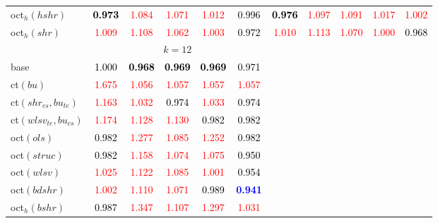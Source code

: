 \begin{tabular}[t]{l|>{}cccc>{}c|ccccc}
oct$_h(hshr)$ & \textcolor{black}{\textbf{0.973}} & \textcolor{red}{1.084} & \textcolor{red}{1.071} & \textcolor{red}{1.012} & \textcolor{black}{0.996} & \textcolor{black}{\textbf{0.976}} & \textcolor{red}{1.097} & \textcolor{red}{1.091} & \textcolor{red}{1.017} & \textcolor{red}{1.002}\\
oct$_h(shr)$ & \textcolor{red}{1.009} & \textcolor{red}{1.108} & \textcolor{red}{1.062} & \textcolor{red}{1.003} & \textcolor{black}{0.972} & \textcolor{red}{1.010} & \textcolor{red}{1.113} & \textcolor{red}{1.070} & \textcolor{red}{1.000} & \textcolor{black}{0.968}\\
\addlinespace[0.3em]
\multicolumn{1}{c}{} & \multicolumn{5}{c}{\textbf{$k = 12$}} & \multicolumn{5}{c}{}\\
base & \textcolor{black}{1.000} & \textcolor{black}{\textbf{0.968}} & \textcolor{black}{\textbf{0.969}} & \textcolor{black}{\textbf{0.969}} & \textcolor{black}{0.971} &  &  &  &  & \\
ct$(bu)$ & \textcolor{red}{1.675} & \textcolor{red}{1.056} & \textcolor{red}{1.057} & \textcolor{red}{1.057} & \textcolor{red}{1.057} &  &  &  &  & \\
ct$(shr_{cs}, bu_{te})$ & \textcolor{red}{1.163} & \textcolor{red}{1.032} & \textcolor{black}{0.974} & \textcolor{red}{1.033} & \textcolor{black}{0.974} &  &  &  &  & \\
ct$(wlsv_{te}, bu_{cs})$ & \textcolor{red}{1.174} & \textcolor{red}{1.128} & \textcolor{red}{1.130} & \textcolor{black}{0.982} & \textcolor{black}{0.982} &  &  &  &  & \\
oct$(ols)$ & \textcolor{black}{0.982} & \textcolor{red}{1.277} & \textcolor{red}{1.085} & \textcolor{red}{1.252} & \textcolor{black}{0.982} &  &  &  &  & \\
oct$(struc)$ & \textcolor{black}{0.982} & \textcolor{red}{1.158} & \textcolor{red}{1.074} & \textcolor{red}{1.075} & \textcolor{black}{0.950} &  &  &  &  & \\
oct$(wlsv)$ & \textcolor{red}{1.025} & \textcolor{red}{1.122} & \textcolor{red}{1.085} & \textcolor{red}{1.001} & \textcolor{black}{0.954} &  &  &  &  & \\
oct$(bdshr)$ & \textcolor{red}{1.002} & \textcolor{red}{1.110} & \textcolor{red}{1.071} & \textcolor{black}{0.989} & \textcolor{blue}{\textbf{0.941}} &  &  &  &  & \\
oct$_h(bshr)$ & \textcolor{black}{0.987} & \textcolor{red}{1.347} & \textcolor{red}{1.107} & \textcolor{red}{1.297} & \textcolor{red}{1.031} &  &  &  &  & \\

\end{tabular}
